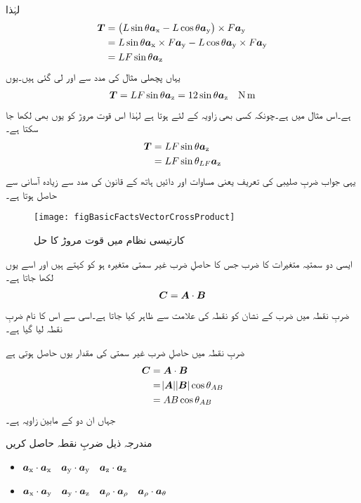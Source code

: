 لہٰذا
\begin{align*}
\kvec{T}&=\left(L \sin \theta \ax-L \cos \theta \ay \right) \times F \ay\\
&=L \sin \theta \ax \times F \ay-L \cos \theta \ay \times F \ay\\
&= L F \sin \theta \az
\end{align*} 
یہاں پچھلی مثال کی مدد سے  اور  لی گئی ہیں۔یوں
\begin{align*}
\kvec{T}= L F \sin \theta \az=12 \sin \theta \az \quad \si{\newton \meter}
\end{align*}
ہے۔اس مثال میں  ہے۔چونکہ کسی بھی زاویہ    کے لئے  ہوتا ہے لہٰذا اس قوت مروڑ کو یوں بھی لکھا جا سکتا ہے۔
\begin{align*}
\kvec{T}&=LF\sin \theta \az\\
&=L F \sin \theta_{LF}\az
\end{align*}
یہی جواب ضربِ صلیبی کی تعریف یعنی مساوات  اور دائیں ہاتھ کے قانون کی مدد سے زیادہ آسانی سے حاصل ہوتا ہے۔
%
\begin{figure}
\centering
\texttt{[image: figBasicFactsVectorCrossProduct]}
\caption{کارتیسی نظام میں قوت مروڑ کا حل}
\label{شکل_حقائق_کارتیسی_مروڑ_کا_حل}
\end{figure}
%
ایسی دو سمتیہ متغیرات کا ضرب جس کا حاصلِ ضرب غیر سمتی متغیرہ ہو کو  کہتے ہیں اور اسے یوں لکھا جاتا ہے۔
\begin{align}
\kvec{C}=\kvec{A} \cdot \kvec{B}
\end{align}
ضربِ نقطہ میں ضرب کے نشان کو نقطہ کی علامت سے ظاہر کیا جاتا ہے۔اسی سے اس کا نام ضربِ نقطہ لیا گیا ہے۔

ضربِ نقطہ میں حاصلِ ضرب غیر سمتی کی مقدار یوں حاصل ہوتی ہے
\begin{gather}
\begin{aligned}\label{مساوات_بنیادی_ضرب_نقطہ_تعریف}
\kvec{C}&=\kvec{A} \cdot \kvec{B}\\
&=\abs{\kvec{A}} \abs{\kvec{B}} \cos \theta_{AB}\\
&=A B \cos \theta_{AB}
\end{aligned}
\end{gather}
جہاں  ان دو کے مابین زاویہ ہے۔

مندرجہ ذیل ضربِ نقطہ حاصل کریں
\begin{itemize}
\item
$\ax \cdot \ax \quad \ay \cdot \ay \quad \az \cdot \az$\\
\item
$\ax \cdot \ay \quad \ay \cdot \az \quad \arho \cdot \arho \quad \arho \cdot \atheta$
\end{itemize}

